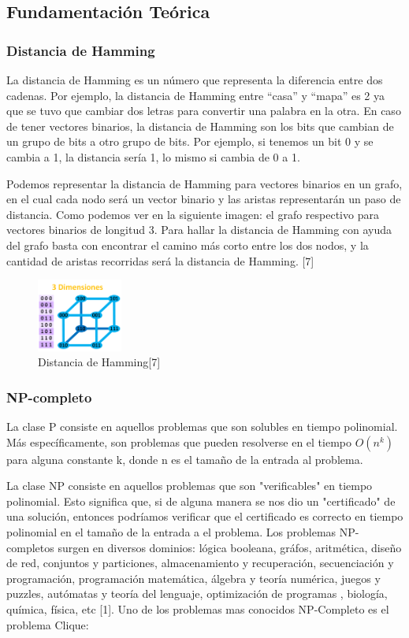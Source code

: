 \documentclass[conference,compsoc]{IEEEtran}
\begin{document}
\subsection{Fundamentación Teórica}
\subsubsection{Distancia de Hamming}

La distancia de Hamming es un número que representa la diferencia entre dos cadenas. Por ejemplo, la distancia de Hamming entre “casa” y “mapa” es 2 ya que se tuvo que cambiar dos letras para convertir una palabra en la otra. En caso de tener vectores binarios, la distancia de Hamming son los bits que cambian de un grupo de bits a otro grupo de bits. Por ejemplo, si tenemos un bit 0 y se cambia a 1, la distancia sería 1, lo mismo si cambia de 0 a 1.

Podemos representar la distancia de Hamming para vectores binarios en un grafo, en el cual cada nodo será un vector binario y las aristas representarán un paso de distancia. Como podemos ver en la siguiente imagen: el grafo respectivo para vectores binarios de longitud 3. Para hallar la distancia de Hamming con ayuda del grafo basta con encontrar el camino más corto entre los dos nodos, y la cantidad de aristas recorridas será la distancia de Hamming. [7]


\begin{figure}[h]
    \centering
    \includegraphics[width=0.25\textwidth]{Problema3/M4.png}
    \caption{Distancia de Hamming[7]}
    \label{fig:mesh1}
\end{figure}


\subsubsection{NP-completo}
La clase P consiste en aquellos problemas que son solubles en tiempo polinomial. Más específicamente, son problemas que pueden resolverse en el tiempo $O (n^{k})$ para alguna constante k, donde n es el tamaño de la entrada al problema.

La clase NP consiste en aquellos problemas que son "verificables" en tiempo polinomial. Esto significa que, si de alguna manera se nos dio un "certificado" de una solución, entonces podríamos verificar que el certificado es correcto en tiempo polinomial en el tamaño de la entrada a el problema.
Los problemas NP-completos surgen en diversos dominios: lógica booleana, gráfos, aritmética, diseño de red, conjuntos y particiones, almacenamiento y recuperación, secuenciación y programación, programación matemática, álgebra y teoría numérica, juegos y puzzles, autómatas y teoría del lenguaje, optimización de programas , biología, química, física, etc [1]. Uno de los problemas mas conocidos NP-Completo es el problema Clique:
\end{document}
